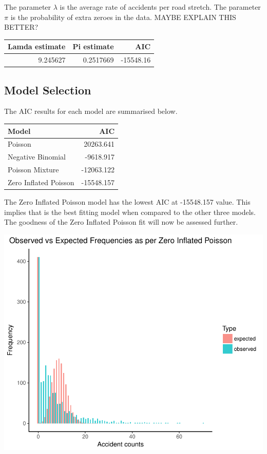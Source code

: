 \documentclass[11pt,preprint, authoryear]{elsarticle}
\numberwithin{equation}{section}
\numberwithin{figure}{section}
\numberwithin{table}{section}
\begin{document}
The parameter \(\lambda\) is the average rate of accidents per road
stretch. The parameter \(\pi\) is the probability of extra zeroes in the
data. MAYBE EXPLAIN THIS BETTER?

\begin{longtable}[]{@{}rrr@{}}
\toprule
Lamda estimate & Pi estimate & AIC\tabularnewline
\midrule
\endhead
9.245627 & 0.2517669 & -15548.16\tabularnewline
\bottomrule
\end{longtable}

\subsection{Model Selection}\label{model-selection}

The AIC results for each model are summarised below.

\begin{longtable}[]{@{}lr@{}}
\toprule
Model & AIC\tabularnewline
\midrule
\endhead
Poisson & 20263.641\tabularnewline
Negative Binomial & -9618.917\tabularnewline
Poisson Mixture & -12063.122\tabularnewline
Zero Inflated Poisson & -15548.157\tabularnewline
\bottomrule
\end{longtable}

The Zero Inflated Poisson model has the lowest AIC at -15548.157 value.
This implies that is the best fitting model when compared to the other
three models. The goodness of the Zero Inflated Poisson fit will now be
assessed further.

\includegraphics{likelihood_files/figure-latex/best_model_fit-1.pdf}
\end{document}
